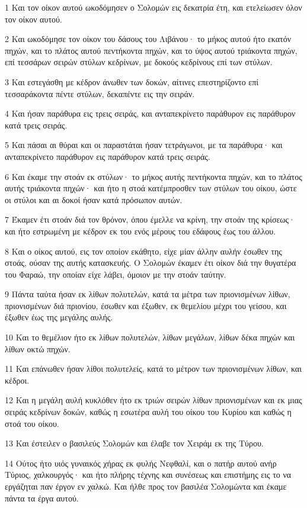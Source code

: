 \par 1 Και τον οίκον αυτού ωκοδόμησεν ο Σολομών εις δεκατρία έτη, και ετελείωσεν όλον τον οίκον αυτού.
\par 2 Και ωκοδόμησε τον οίκον του δάσους του Λιβάνου· το μήκος αυτού ήτο εκατόν πηχών, και το πλάτος αυτού πεντήκοντα πηχών, και το ύψος αυτού τριάκοντα πηχών, επί τεσσάρων σειρών στύλων κεδρίνων, με δοκούς κεδρίνους επί των στύλων.
\par 3 Και εστεγάσθη με κέδρον άνωθεν των δοκών, αίτινες επεστηρίζοντο επί τεσσαράκοντα πέντε στύλων, δεκαπέντε εις την σειράν.
\par 4 Και ήσαν παράθυρα εις τρεις σειράς, και ανταπεκρίνετο παράθυρον εις παράθυρον κατά τρεις σειράς.
\par 5 Και πάσαι αι θύραι και οι παραστάται ήσαν τετράγωνοι, με τα παράθυρα· και ανταπεκρίνετο παράθυρον εις παράθυρον κατά τρεις σειράς.
\par 6 Και έκαμε την στοάν εκ στύλων· το μήκος αυτής πεντήκοντα πηχών, και το πλάτος αυτής τριάκοντα πηχών· και ήτο η στοά κατέμπροσθεν των στύλων του οίκου, ώστε οι στύλοι και αι δοκοί ήσαν κατά πρόσωπον αυτών.
\par 7 Έκαμεν έτι στοάν διά τον θρόνον, όπου έμελλε να κρίνη, την στοάν της κρίσεως· και ήτο εστρωμένη με κέδρον εκ του ενός μέρους του εδάφους έως του άλλου.
\par 8 Και ο οίκος αυτού, εις τον οποίον εκάθητο, είχε μίαν άλλην αυλήν έσωθεν της στοάς, ούσαν της αυτής κατασκευής. Ο Σολομών έκαμεν έτι οίκον διά την θυγατέρα του Φαραώ, την οποίαν είχε λάβει, όμοιον με την στοάν ταύτην.
\par 9 Πάντα ταύτα ήσαν εκ λίθων πολυτελών, κατά τα μέτρα των πριονισμένων λίθων, πριονισμένων διά πριονίου, έσωθεν και έξωθεν, εκ θεμελίου μέχρι του γείσου, και έξωθεν έως της μεγάλης αυλής.
\par 10 Και το θεμέλιον ήτο εκ λίθων πολυτελών, λίθων μεγάλων, λίθων δέκα πηχών και λίθων οκτώ πηχών.
\par 11 Και επάνωθεν ήσαν λίθοι πολυτελείς, κατά το μέτρον των πριονισμένων λίθων, και κέδροι.
\par 12 Και η μεγάλη αυλή κυκλόθεν ήτο εκ τριών σειρών λίθων πριονισμένων και εκ μιας σειράς κεδρίνων δοκών, καθώς η εσωτέρα αυλή του οίκου του Κυρίου και καθώς η στοά του οίκου.
\par 13 Και έστειλεν ο βασιλεύς Σολομών και έλαβε τον Χειράμ εκ της Τύρου.
\par 14 Ούτος ήτο υιός γυναικός χήρας εκ φυλής Νεφθαλί, και ο πατήρ αυτού ανήρ Τύριος, χαλκουργός· και ήτο πλήρης τέχνης και συνέσεως και επιστήμης εις το να εργάζηται παν έργον εν χαλκώ. Και ήλθε προς τον βασιλέα Σολομώντα και έκαμε πάντα τα έργα αυτού.
